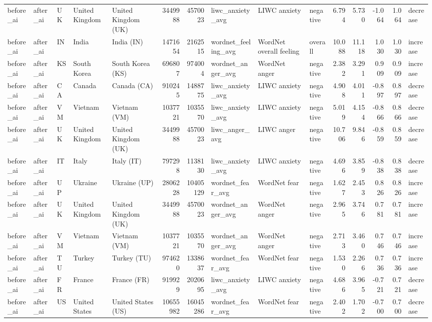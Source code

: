 \begin{tabular}{lllllrrlllrrrrl}
before\_ai & after\_ai & UK & United Kingdom & United Kingdom (UK) & 3449988 & 4570023 & liwc\_anxiety\_avg & LIWC anxiety & negative & 6.794 & 5.730 & -1.064 & 1.064 & decrease \\
before\_ai & after\_ai & IN & India & India (IN) & 1471654 & 2162515 & wordnet\_feeling\_avg & WordNet overall feeling & overall & 10.088 & 11.118 & 1.030 & 1.030 & increase \\
before\_ai & after\_ai & KS & South Korea & South Korea (KS) & 696807 & 974004 & wordnet\_anger\_avg & WordNet anger & negative & 2.382 & 3.291 & 0.909 & 0.909 & increase \\
before\_ai & after\_ai & CA & Canada & Canada (CA) & 910245 & 1488775 & liwc\_anxiety\_avg & LIWC anxiety & negative & 4.908 & 4.011 & -0.897 & 0.897 & decrease \\
before\_ai & after\_ai & VM & Vietnam & Vietnam (VM) & 1037721 & 1035570 & liwc\_anxiety\_avg & LIWC anxiety & negative & 5.019 & 4.154 & -0.866 & 0.866 & decrease \\
before\_ai & after\_ai & UK & United Kingdom & United Kingdom (UK) & 3449988 & 4570023 & liwc\_anger\_avg & LIWC anger & negative & 10.706 & 9.846 & -0.859 & 0.859 & decrease \\
before\_ai & after\_ai & IT & Italy & Italy (IT) & 797298 & 1138130 & liwc\_anxiety\_avg & LIWC anxiety & negative & 4.696 & 3.859 & -0.838 & 0.838 & decrease \\
before\_ai & after\_ai & UP & Ukraine & Ukraine (UP) & 2806228 & 10405129 & wordnet\_fear\_avg & WordNet fear & negative & 1.627 & 2.453 & 0.826 & 0.826 & increase \\
before\_ai & after\_ai & UK & United Kingdom & United Kingdom (UK) & 3449988 & 4570023 & wordnet\_anger\_avg & WordNet anger & negative & 2.965 & 3.746 & 0.781 & 0.781 & increase \\
before\_ai & after\_ai & VM & Vietnam & Vietnam (VM) & 1037721 & 1035570 & wordnet\_anger\_avg & WordNet anger & negative & 2.713 & 3.460 & 0.746 & 0.746 & increase \\
before\_ai & after\_ai & TU & Turkey & Turkey (TU) & 974620 & 1338637 & wordnet\_fear\_avg & WordNet fear & negative & 1.530 & 2.266 & 0.736 & 0.736 & increase \\
before\_ai & after\_ai & FR & France & France (FR) & 919929 & 2020695 & liwc\_anxiety\_avg & LIWC anxiety & negative & 4.686 & 3.965 & -0.721 & 0.721 & decrease \\
before\_ai & after\_ai & US & United States & United States (US) & 10655982 & 16045286 & wordnet\_fear\_avg & WordNet fear & negative & 2.402 & 1.702 & -0.700 & 0.700 & decrease \\

\end{tabular}
